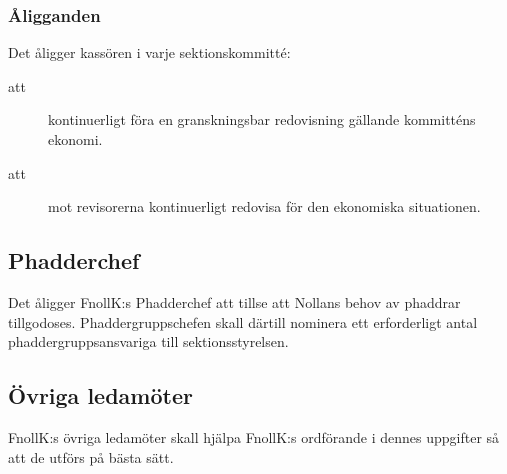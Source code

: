 \documentclass[a4paper]{article}
\begin{document}
\begin{foreningenv}{\forening{}}
    \subsubsection{Åligganden}
    Det åligger kassören i varje sektionskommitté:
    \begin{description}
        \item[att] kontinuerligt föra en granskningsbar redovisning gällande kommitténs ekonomi.
        \item[att] mot revisorerna kontinuerligt redovisa för den ekonomiska situationen.
    \end{description}
    
    \subsection{Phadderchef}
    Det åligger FnollK:s Phadderchef att tillse att Nollans behov av phaddrar tillgodoses. Phaddergruppschefen skall därtill nominera ett erforderligt antal phaddergruppsansvariga till sektionsstyrelsen.
    
    \subsection{Övriga ledamöter}
    FnollK:s övriga ledamöter skall hjälpa FnollK:s ordförande i dennes uppgifter så att de utförs på bästa sätt.
\end{foreningenv}
\end{document}
